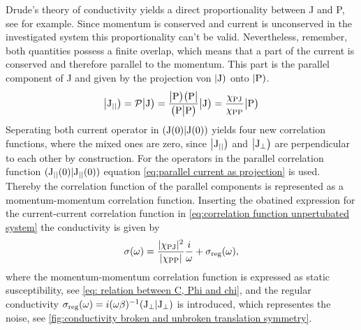Drude's theory of conductivity yields a direct proportionality between J and P, see \cite{Gross&Marx} for example.
Since momentum is conserved and current is unconserved in the investigated system this proportionality can't be valid.
Nevertheless, remember, both quantities possess a finite overlap, which means that a part of the current is conserved and therefore parallel to the momentum.
This part is the parallel component of J and given by the projection von $|\mathrm{\mathrm{J}})$ onto $|\mathrm{\mathrm{P}})$.
%
\begin{align}
	\big|{\mathrm{J}_{\mid\mid}}\big) = \mathcal{P}\big|{\mathrm{J}}\big) = \frac{\big|{\mathrm{P}}\big)\big({\mathrm{P}}\big|}{\big({\mathrm{P}}\big|{\mathrm{P}}\big)} \big|{\mathrm{J}}\big) = \frac{\chi_{\mathrm{PJ}}}{\chi_{\mathrm{PP}}} \big|{\mathrm{P}}\big)
	\label{eq:parallel current as projection}
\end{align}
%
Seperating both current operator in $({\mathrm{J}(0)}|{\mathrm{J}(0)})$ yields four new correlation functions, where the mixed ones are zero, since $\big|{\mathrm{J}_{\mid\mid}}\big)$ and $\big|{\mathrm{J}_{\bot}}\big)$ are perpendicular to each other by construction.
For the operators in the parallel correlation function $({\mathrm{J}_{\mid\mid}(0)}|{\mathrm{J}_{\mid\mid}(0)})$ equation \eqref{eq:parallel current as projection} is used.
Thereby the correlation function of the parallel components is represented as a momentum-momentum correlation function.
Inserting the obatined expression for the current-current correlation function in \eqref{eq:correlation function unpertubated system} the conductivity is given by 
%
\begin{align}
	\sigma (\omega) = \frac{\vert\chi_{\mathrm{PJ}}\vert^{2}}{\vert\chi_{\mathrm{PP}}\vert} \frac{i}{\omega}  + \sigma_{\mathrm{reg}}(\omega),
\end{align}
%
where the momentum-momentum correlation function is expressed as static susceptibility, see \eqref{eq: relation between C, Phi and chi}, and the regular conductivity $\sigma_{\mathrm{reg}}(\omega) = i(\omega \beta)^{-1} ({\mathrm{J}_{\bot}}|{\mathrm{J}_{\bot}})$ is introduced, which representes the noise, see \ref{fig:conductivity broken and unbroken translation symmetry}.

